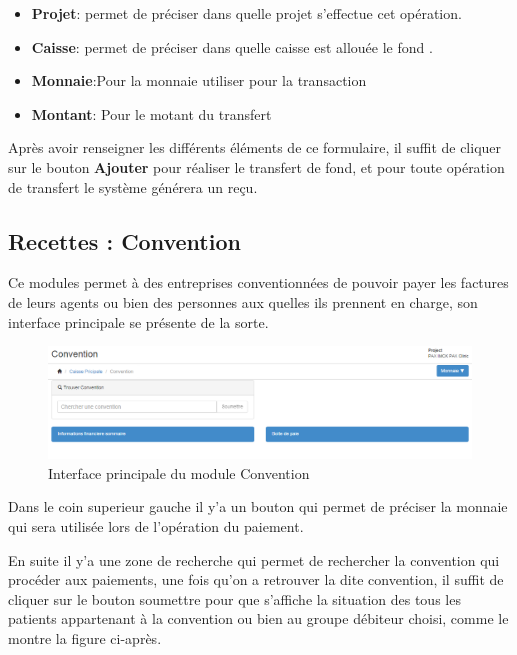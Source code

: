 \documentclass[12pt,a4paper]{report}
\begin{document}
\begin{itemize}
\item \textbf{Projet}: permet de préciser dans quelle projet s'effectue cet opération. \\
\item \textbf{Caisse}: permet de préciser dans quelle caisse est allouée le fond .\\
\item \textbf{Monnaie}:Pour la monnaie utiliser pour la transaction \\
\item \textbf{Montant}: Pour le motant du transfert\\
\end{itemize}
Après avoir renseigner les différents éléments de ce formulaire, il suffit de cliquer sur le bouton \textbf{Ajouter} pour réaliser le transfert de fond, et pour toute opération de transfert le système générera un reçu.

\newpage
\subsection{Recettes : Convention}
Ce modules permet à des entreprises conventionnées de pouvoir payer les factures de leurs agents ou bien des personnes aux quelles ils prennent en charge, son interface principale se présente de la sorte.

\begin{figure}[h]
\begin{center}
\includegraphics[width=14cm]{pic/conventionMenu.png}
\end{center}
\caption{Interface principale du module Convention}
\label{Interface principale du module Convention}
\end{figure}

Dans le coin superieur gauche il y'a un bouton qui permet de préciser la monnaie qui sera utilisée lors de l'opération du paiement.

En suite il y'a une zone de recherche qui permet de rechercher la convention qui procéder aux paiements, une fois qu'on a retrouver la dite convention, il suffit de cliquer sur le bouton soumettre pour que s'affiche la situation des tous les patients appartenant à la convention ou bien au groupe débiteur choisi, comme le montre la figure ci-après.
\end{document}
